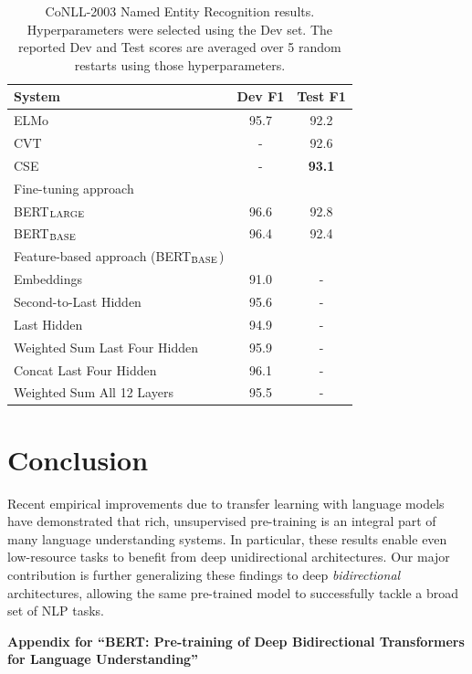 \documentclass[11pt,a4paper]{article}
\newcommand\bertbase{BERT$_{\small \textsc{BASE}}$\xspace}
\newcommand\bertlarge{BERT$_{\small \textsc{LARGE}}$\xspace}
\begin{document}
\begin{table}[t]
\small
\centering
 \begin{tabular}{@{}lcc@{}}
\toprule
System & Dev F1 & Test F1 \\
\midrule
ELMo~\cite{peters-etal:2018:_deep}& 95.7 & 92.2 \\
CVT~\cite{clark2018semi} & - & 92.6 \\
CSE~\cite{akbik2018contextual} & - & {\bf 93.1} \\
\midrule
Fine-tuning approach & & \\
\;\;\;\bertlarge  & 96.6 & 92.8 \\
\;\;\;\bertbase& 96.4 & 92.4 \\
\midrule
Feature-based approach (\bertbase) &  &  \\
\;\;\;Embeddings & 91.0 &- \\
\;\;\;Second-to-Last Hidden   & 95.6&- \\
\;\;\;Last Hidden            & 94.9&- \\
\;\;\;Weighted Sum Last Four Hidden        & 95.9&- \\
\;\;\;Concat Last Four Hidden        & 96.1&- \\
\;\;\;Weighted Sum All 12 Layers        & 95.5&- \\
\bottomrule
\end{tabular}
\caption{CoNLL-2003 Named Entity Recognition results. Hyperparameters were selected using the Dev set. The reported Dev and Test scores are averaged over 5 random restarts using those hyperparameters.
}
\label{tab:ner_results}    
\label{tab:pretrained_embeddings}    
\end{table}

\section{Conclusion}
Recent empirical improvements due to transfer learning with language models have demonstrated that rich, unsupervised pre-training is an integral part of many language understanding systems. In particular, these results enable even low-resource tasks to benefit from deep unidirectional architectures. Our major contribution is further generalizing these findings to deep \emph{bidirectional} architectures, allowing the same pre-trained model to successfully tackle a broad set of NLP tasks.




\appendix                                     
\begin{center}
{\bf \large{
    Appendix for ``BERT: Pre-training of Deep Bidirectional Transformers for Language Understanding''}}
\end{center}
\end{document}
